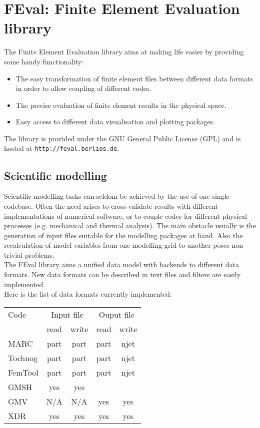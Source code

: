 
\section{FEval: Finite Element Evaluation library}
\label{sec:feval:-finite-elem}

The Finite Element Evaluation library aims at making life easier by providing
some handy functionality:

\begin{itemize}
\item The easy transformation of finite element files between different data
  formats in order to allow coupling of different codes.
\item The precise evaluation of finite element results in the physical space.
\item Easy access to different data visualisation and plotting packages.
\end{itemize}

The library is provided under the GNU General Public License (GPL) and is
hosted at \texttt{http://feval.berlios.de}.

\subsection{Scientific modelling}
\label{sec:scientific-modelling}

Scientific modelling tasks can seldom be achieved by the use of one single
codebase.  Often the need arises to cross-validate results with different
implementations of numerical software, or to couple codes for different
physical processes (e.g. mechanical and thermal analysis).  The main obstacle
usually is the generation of input files suitable for the modelling packages
at hand.  Also the recalculation of model variables from one modelling grid to
another poses non-trivial problems.\\

The FEval library aims a unified data model with backends to different data
formats.  New data formats can be described in text files and filters are
easily implemented.\\

Here is the list of  data formats currently implemented:\\

\begin{tabular}{lcccc}
\hline
Code    & \multicolumn{2}{c}{Input file} & \multicolumn{2}{c}{Ouput file} \\
        & read & write                   &  read & write \\
\hline
MARC    & part & part                    &  part & njet  \\
Tochnog & part & part                    &  part & njet  \\
FemTool & part & part                    &  part & njet  \\
GMSH    & yes  & yes                     &       &       \\
GMV     & N/A  & N/A                     &  yes  & yes   \\
XDR     & yes  & yes                     &  yes  & yes   \\
\hline
\end{tabular}

